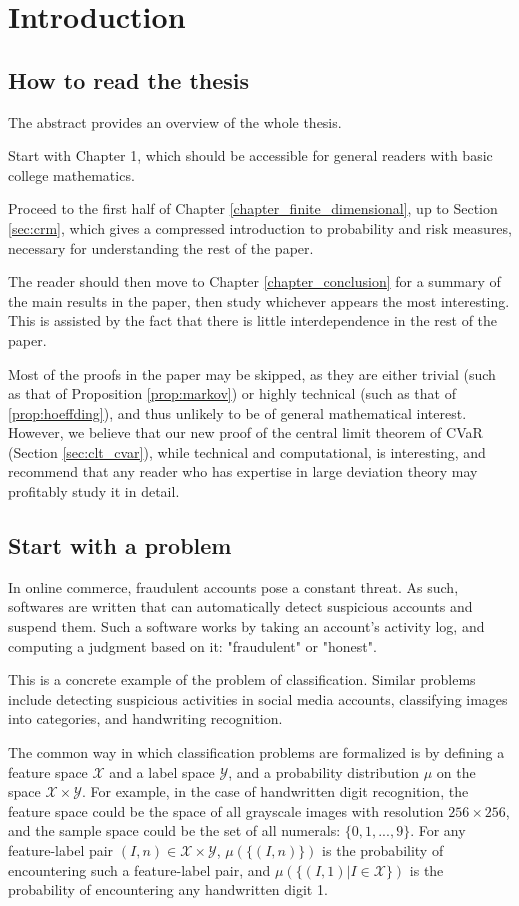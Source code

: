 
\chapter{Introduction}
\label{chapter_introduction}
\section{How to read the thesis}
The abstract provides an overview of the whole thesis. 

Start with Chapter 1, which should be accessible for general readers with basic college mathematics. 

Proceed to the first half of Chapter \ref{chapter_finite_dimensional}, up to Section \ref{sec:crm}, which gives a compressed introduction to probability and risk measures, necessary for understanding the rest of the paper. 

The reader should then move to Chapter \ref{chapter_conclusion} for a summary of the main results in the paper, then study whichever appears the most interesting. This is assisted by the fact that there is little interdependence in the rest of the paper.

Most of the proofs in the paper may be skipped, as they are either trivial (such as that of Proposition \ref{prop:markov}) or highly technical (such as that of \ref{prop:hoeffding}), and thus unlikely to be of general mathematical interest. However, we believe that our new proof of the central limit theorem of CVaR (Section \ref{sec:clt_cvar}), while technical and computational, is interesting, and recommend that any reader who has expertise in large deviation theory may profitably study it in detail.

\section{Start with a problem}
In online commerce, fraudulent accounts pose a constant threat. As such, softwares are written that can automatically detect suspicious accounts and suspend them. Such a software works by taking an account's activity log, and computing a judgment based on it: "fraudulent" or "honest".

This is a concrete example of the problem of classification. Similar problems include detecting suspicious activities in social media accounts, classifying images into categories, and handwriting recognition.

The common way in which classification problems are formalized is by defining a feature space $\mathcal{X}$ and a label space $\mathcal{Y}$, and a probability distribution $\mu$ on the space $\mathcal{X}\times\mathcal{Y}$. For example, in the case of handwritten digit recognition, the feature space could be the space of all grayscale images with resolution $256\times 256$, and the sample space could be the set of all numerals: $\{0, 1, ..., 9\}$. For any feature-label pair $(I, n)\in \mathcal{X}\times\mathcal{Y}$, $\mu(\{(I, n)\})$ is the probability of encountering such a feature-label pair, and $\mu(\{(I, 1) | I \in \mathcal{X} \})$ is the probability of encountering any handwritten digit 1.


